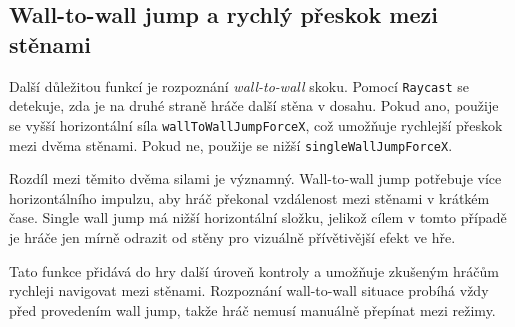 \subsection{Wall-to-wall jump a rychlý přeskok mezi stěnami}

Další důležitou funkcí je rozpoznání \textit{wall-to-wall} skoku. Pomocí \texttt{Raycast} se detekuje, zda je na druhé straně hráče další stěna v dosahu. Pokud ano, použije se vyšší horizontální síla \texttt{wallToWallJumpForceX}, což umožňuje rychlejší přeskok mezi dvěma stěnami. Pokud ne, použije se nižší \texttt{singleWallJumpForceX}.

Rozdíl mezi těmito dvěma silami je významný. Wall-to-wall jump potřebuje více horizontálního impulzu, aby hráč překonal vzdálenost mezi stěnami v krátkém čase. Single wall jump má nižší horizontální složku, jelikož cílem v tomto případě je hráče jen mírně odrazit od stěny pro vizuálně přívětivější efekt ve hře.

Tato funkce přidává do hry další úroveň kontroly a umožňuje zkušeným hráčům rychleji navigovat mezi stěnami. Rozpoznání wall-to-wall situace probíhá vždy před provedením wall jump, takže hráč nemusí manuálně přepínat mezi režimy.